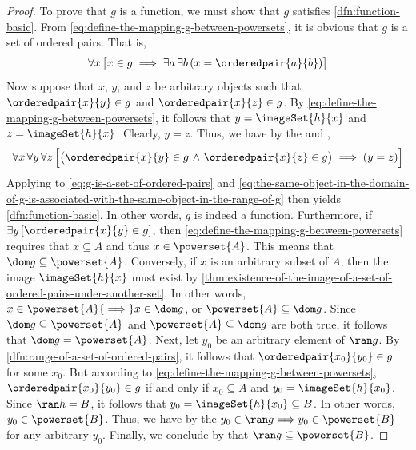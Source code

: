 \begin{proof}
    \vspace{0.1cm}
    \noindent
    To prove that \( g \) is a function, we must show that \( g \) satisfies \cref{dfn:function-basic}.
    From \eqref{eq:define-the-mapping-g-between-powersets}, it is obvious that \( g \) is a set of ordered pairs. That is,
    \begin{equation}
        \label{eq:g-is-a-set-of-ordered-pairs}
        \forall x \, \big[ x \in g \implies \exists a \, \exists b \, \mleft( x = \orderedpair{a}{b} \mright) \big]
    \end{equation}
    Now suppose that \( x \), \( y \), and \( z \) be arbitrary objects such that \( \orderedpair{x}{y} \in g \) and \( \orderedpair{x}{z} \in g \).
    By \eqref{eq:define-the-mapping-g-between-powersets}, it follows that \( y = \imageSet{h}{x} \) and \( z = \imageSet{h}{x} \).
    Clearly, \( y = z \).
    Thus, we have by the  and ,
    \begin{equation}
        \label{eq:the-same-object-in-the-domain-of-g-is-associated-with-the-same-object-in-the-range-of-g}
        \forall x \, \forall y \, \forall z \, \Big[ \big( \orderedpair{x}{y} \in g \,\,{\land}\,\, \orderedpair{x}{z} \in g \big) \implies \mleft( y = z \mright) \Big]
    \end{equation}
    Applying  to \eqref{eq:g-is-a-set-of-ordered-pairs}
    and \eqref{eq:the-same-object-in-the-domain-of-g-is-associated-with-the-same-object-in-the-range-of-g} then yields \cref{dfn:function-basic}. In other words,
    \( g \) is indeed a function. Furthermore, if \( \exists y \, \mleft[ \orderedpair{x}{y} \in g \mright] \), then \eqref{eq:define-the-mapping-g-between-powersets}
    requires that \( x \subseteq A \) and thus \( x \in \powerset{A} \). This means that \( \dom g \subseteq \powerset{A} \).
    Conversely, if \( x \) is an arbitrary subset of \( A \), then the image \( \imageSet{h}{x} \) must exist
    by \cref{thm:existence-of-the-image-of-a-set-of-ordered-pairs-under-another-set}. In other words, \( x \in \powerset{A} {\implies} x \in \dom g \), or
    \( \powerset{A} \subseteq \dom g \). Since \( \dom g \subseteq \powerset{A} \) and \( \powerset{A} \subseteq \dom g \) are both true, it follows that
    \( \dom g = \powerset{A}\). Next, let \( y_{0} \) be an arbitrary element of \( \ran g \). By \cref{dfn:range-of-a-set-of-ordered-pairs}, it follows
    that \( \orderedpair{x_{0}}{y_{0}} \in g \) for some \( x_{0} \). But according to \eqref{eq:define-the-mapping-g-between-powersets},
    \( \orderedpair{x_{0}}{y_{0}} \in g \) if and only if \( x_{0} \subseteq A \) and \( y_{0} = \imageSet{h}{x_{0}} \). Since \( \ran h = B \), it follows
    that \( y_{0} = \imageSet{h}{x_{0}} \subseteq B \). In other words, \( y_{0} \in \powerset{B} \).
    Thus, we have by the  \( y_{0} \in \ran g {\implies} y_{0} \in \powerset{B} \) for any
    arbitrary \( y_{0} \). Finally, we conclude by  that \( \ran g \subseteq \powerset{B}\).


\end{proof}
